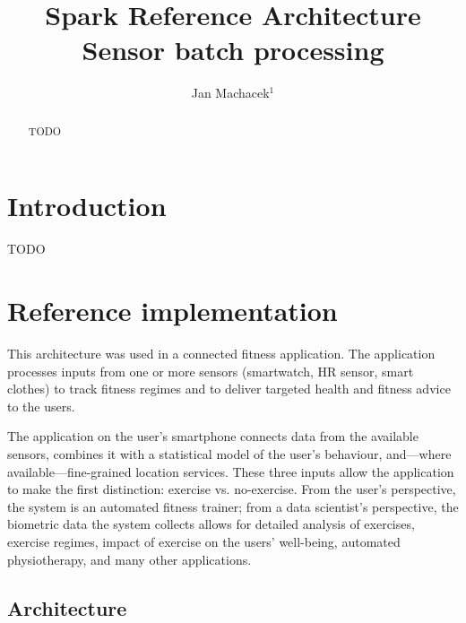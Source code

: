 \documentclass[a4paper, 10 pt, conference]{IEEEtran}
\title{Spark Reference Architecture \\ Sensor batch processing}
\author{Jan Machacek$^{1}$%
}
\begin{document}
\maketitle
\thispagestyle{empty}
\pagestyle{empty}

\begin{abstract}

TODO

\end{abstract}


\section{Introduction}

TODO

\section{Reference implementation}

This architecture was used in a connected fitness application. The application processes inputs from one or more sensors (smartwatch, HR sensor, smart clothes) to track fitness regimes and to deliver targeted health and fitness advice to the users. 

The application on the user's smartphone connects data from the available sensors, combines it with a statistical model of the user's behaviour, and---where available---fine-grained location services. These three inputs allow the application to make the first distinction: exercise vs. no-exercise. From the user's perspective, the system is an automated fitness trainer; from a data scientist's perspective, the biometric data the system collects allows for detailed analysis of exercises, exercise regimes, impact of exercise on the users' well-being, automated physiotherapy, and many other applications.

\subsection{Architecture}
\end{document}
